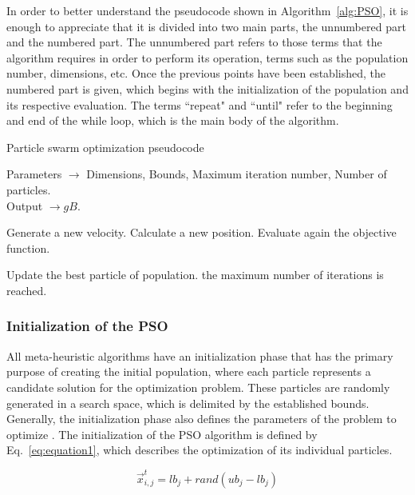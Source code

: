 In order to better understand the pseudocode shown in Algorithm~\ref{alg:PSO}, it is enough to appreciate that it is divided into two main parts, the unnumbered part and the numbered part. The unnumbered part refers to those terms that the algorithm requires in order to perform its operation, terms such as the population number, dimensions, etc. Once the previous points have been established, the numbered part is given, which begins with the initialization of the population and its respective evaluation. The terms ``repeat" and ``until" refer to the beginning and end of the while loop, which is the main body of the algorithm.

\begin{algorithm}[h!]
\caption{Particle swarm optimization pseudocode}
Parameters $\rightarrow$ Dimensions, Bounds, Maximum iteration number, Number of particles.\\
Output $\rightarrow gB$.   
\begin{algorithmic}[1]
\REPEAT
{}

\STATE Generate a new velocity.
\STATE Calculate a new position.
\STATE Evaluate again the objective function.
\ENDFOR
		
\STATE Update the best particle of population.
\UNTIL the maximum number of iterations is reached.
\end{algorithmic}
\label{alg:PSO}
\end{algorithm}

\subsubsection{Initialization of the PSO}

All meta-heuristic algorithms have an initialization phase that has the primary purpose of creating the initial population, where each particle represents a candidate solution for the optimization problem. These particles are randomly generated in a search space, which is delimited by the established bounds. Generally, the initialization phase also defines the parameters of the problem to optimize \cite{erick2021matlab}. The initialization of the PSO algorithm is defined by Eq.~\ref{eq:equation1}, which describes the optimization of its individual particles.

\begin{equation}
\vec{x}_{i,j}^t=lb_j+rand(ub_j-lb_j)
\label{eq:equation1}
\end{equation}

